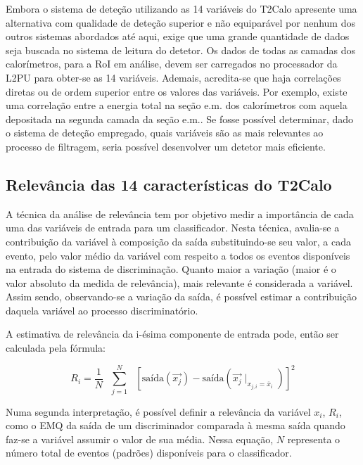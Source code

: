 Embora o sistema de deteção utilizando as 14 variáveis do T2Calo apresente uma
alternativa com qualidade de deteção superior e não equiparável por nenhum dos
outros sistemas abordados até aqui, exige que uma grande quantidade de dados
seja buscada no sistema de leitura do detetor. Os dados de todas as camadas
dos calorímetros, para a RoI em análise, devem ser carregados no processador
da L2PU para obter-se as 14 variáveis. Ademais, acredita-se que haja
correlações diretas ou de ordem superior entre os valores das variáveis. Por
exemplo, existe uma correlação entre a energia total na seção e.m. dos
calorímetros com aquela depositada na segunda camada da seção e.m.. Se fosse
possível determinar, dado o sistema de deteção empregado, quais variáveis são
as mais relevantes ao processo de filtragem, seria possível desenvolver um
detetor mais eficiente.

\subsection{Relevância das 14 características do T2Calo}
\label{sec:t2calo-all-relev}

A técnica da análise de relevância \cite{relevance} tem por objetivo medir a
importância de cada uma das variáveis de entrada para um classificador. Nesta
técnica, avalia-se a contribuição da variável à composição da saída
substituindo-se seu valor, a cada evento, pelo valor médio da variável com
respeito a todos os eventos disponíveis na entrada do sistema de
discriminação. Quanto maior a variação (maior é o valor absoluto da medida de
relevância), mais relevante é considerada a variável. Assim sendo,
observando-se a variação da saída, é possível estimar a contribuição daquela
variável ao processo discriminatório.

A estimativa de relevância da i-ésima componente de entrada pode, então ser
calculada pela fórmula:

\begin{equation}
R_i = \frac{1}{N} \text{ } \overset{N}{\underset{j=1}{\sum}} \text{ }
[\text{saída}(\overrightarrow{x_j}) -
\text{saída}(\overrightarrow{x_j}\mid_{x_{j,i} = \overline{x}_i})]^2 
\label{eq:relevance-mse}
\end{equation}

Numa segunda interpretação, é possível definir a relevância da variável $x_i$,
$R_i$, como o EMQ da saída de um discriminador comparada à mesma saída quando
faz-se a variável assumir o valor de sua média. Nessa equação, $N$ representa
o número total de eventos (padrões) disponíveis para o classificador.

